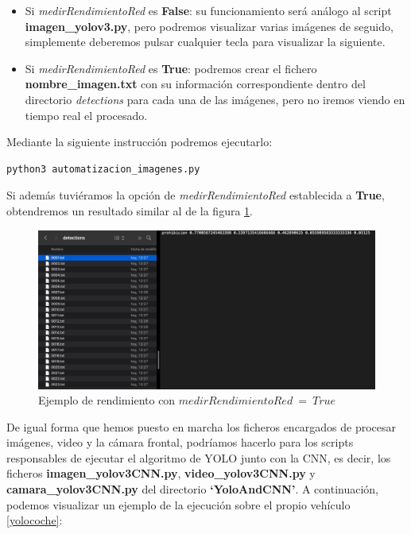 \begin{itemize}
\item Si \textit{medirRendimientoRed} es \textbf{False}: su funcionamiento será análogo al script \textbf{imagen_yolov3.py}, pero podremos visualizar varias imágenes de seguido, simplemente deberemos pulsar cualquier tecla para visualizar la siguiente. 

\item Si \textit{medirRendimientoRed} es \textbf{True}: podremos crear el fichero \textbf{nombre_imagen.txt} con su información correspondiente dentro del directorio \textit{detections} para cada una de las imágenes, pero no iremos viendo en tiempo real el procesado.
\end{itemize}

Mediante la siguiente instrucción podremos ejecutarlo:

\begin{lstlisting}
python3 automatizacion_imagenes.py
\end{lstlisting}

Si además tuviéramos la opción de \textit{medirRendimientoRed} establecida a \textbf{True}, obtendremos un resultado similar al de la figura \ref{detecc4}.

\begin{figure}[H]
	\centering
	\includegraphics[width=\textwidth]{Imagenes/AnexoI_Manual/AA/deteccion4.pdf}
	\caption{Ejemplo de rendimiento con $medirRendimientoRed \ =\ True$}
	\label{detecc4}
\end{figure}

De igual forma que hemos puesto en marcha los ficheros encargados de procesar imágenes, video y la cámara frontal, podríamos hacerlo para los scripts responsables de ejecutar el algoritmo de YOLO junto con la CNN, es decir, los ficheros \textbf{imagen_yolov3CNN.py}, \textbf{video_yolov3CNN.py} y \textbf{camara_yolov3CNN.py} del directorio \textbf{‘YoloAndCNN’}. A continuación, podemos visualizar un ejemplo de la ejecución sobre el propio vehículo \ref{yolocoche}:

